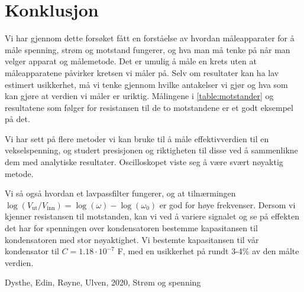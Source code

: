 \documentclass[reprint, english,notitlepage]{revtex4-1}  %
\begin{document}
\section{Konklusjon}
Vi har gjennom dette forsøket fått en forståelse av hvordan måleapparater for å måle spenning, strøm og motstand fungerer, og hva man må tenke på når man velger apparat og målemetode. Det er umulig å måle en krets uten at måleapparatene påvirker kretsen vi måler på. Selv om resultater kan ha lav estimert usikkerhet, må vi tenke gjennom hvilke antakelser vi gjør og hva som kan gjøre at verdien vi måler er uriktig. Målingene i \ref{table:motstander} og resultatene som følger for resistansen til de to motstandene er et godt eksempel på det.

Vi har sett på flere metoder vi kan bruke til å måle effektivverdien til en vekselspenning, og studert presisjonen og riktigheten til disse ved å sammenlikne dem med analytiske resultater. Oscilloskopet viste seg å være svært nøyaktig metode.

Vi så også hvordan et lavpassfilter fungerer, og at tilnærmingen $\log ( V_{\text{ut}}/V_{\text{inn}}) = \log (\omega) - \log (\omega_0)$ er god for høye frekvenser. Dersom vi kjenner resistansen til motstanden, kan vi ved å variere signalet og se på effekten det har for spenningen over kondensatoren bestemme kapasitansen til kondensatoren med stor nøyaktighet. Vi bestemte kapasitansen til vår kondensator til $C = 1.18 \cdot 10^{-7}$ F, med en usikkerhet på rundt 3-4\% av den målte verdien.



\onecolumngrid
\vspace{1cm} %


\begin{thebibliography}{}
 Dysthe, Edin, Røyne, Ulven,  2020, Strøm og spenning

\end{thebibliography}
\end{document}
